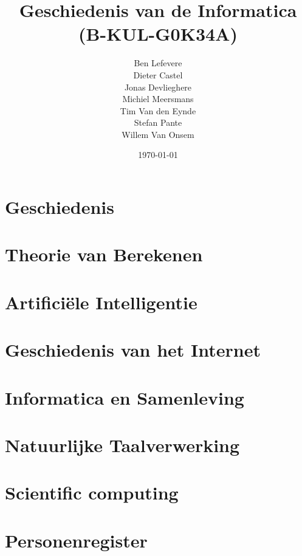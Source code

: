 \documentclass[11pt]{article}
\title{Geschiedenis van de Informatica \\ (B-KUL-G0K34A)}
\date{\today}
\author{Ben Lefevere \\ Dieter Castel \\ Jonas Devlieghere \\ Michiel Meersmans \\ Tim Van den Eynde \\  Stefan Pante \\ Willem Van Onsem }
\theoremstyle{definition}
\begin{document}
\maketitle
\newpage

\tableofcontents

\newpage

\section{Geschiedenis}




\section{Theorie van Berekenen}


\section{Artifici\"ele Intelligentie}


\section{Geschiedenis van het Internet}


\section{Informatica en Samenleving}


\section{Natuurlijke Taalverwerking}


\section{Scientific computing}



\appendix
\section{Personenregister}



\printindex

%
%
\nocite{*}
\end{document}
